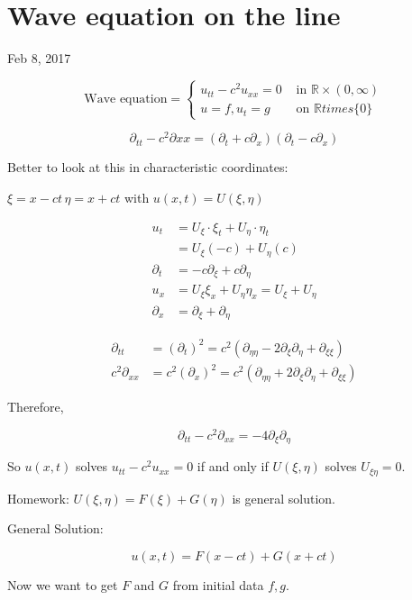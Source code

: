 \documentclass[main.tex]{subfiles}
\begin{document}
\section{Wave equation on the line}

Feb 8, 2017

\vspace{3mm}

$$\textrm{Wave equation} = \begin{cases}
u_{tt} - c^2 u_{xx} = 0 & \textrm{ in } \mathbb{R} \times (0, \infty) \\
u = f, u_t = g & \textrm{ on } \mathbb{R} times \{0\}
\end{cases}$$

$$\partial_{tt} - c^2\partial{xx} = (\partial_t + c\partial_x)(\partial_t - c\partial_x)$$

Better to look at this in characteristic coordinates:

$\xi = x - ct\, \eta = x + ct$ with $u(x, t) = U(\xi, \eta)$

\begin{align}
u_t &= U_\xi\cdot \xi_t + U_\eta\cdot \eta_t \\
    &= U_\xi(-c) + U_\eta(c) \\
\partial_t &= -c\partial_\xi + c\partial_\eta \\
u_x &= U_\xi \xi_x + U_\eta \eta_x = U_\xi + U_\eta \\
\partial_x &= \partial_\xi + \partial_\eta
\end{align}

\begin{align}
    \partial_{tt} &= {\left(\partial_{t}\right)}^2 = c^2(\partial_{\eta\eta} - 2\partial_\xi\partial_\eta + \partial_{\xi\xi}) \\
    c^2 \partial_{xx} &= c^2{(\partial_x)}^2 = c^2(\partial_{\eta\eta} + 2\partial_\xi\partial_\eta + \partial_{\xi\xi})
\end{align}

Therefore,

$$\partial_{tt} - c^2\partial_{xx} = -4\partial_\xi\partial_\eta$$

So $u(x, t)$ solves $u_{tt} - c^2u_{xx} = 0$ if and only if $U(\xi, \eta)$ solves $U_{\xi\eta} = 0$.

Homework: $U(\xi, \eta) = F(\xi) + G(\eta)$ is general solution.

General Solution:

$$u(x, t) = F(x - ct) + G(x + ct)$$

Now we want to get $F$ and $G$ from initial data $f, g$.
\end{document}
